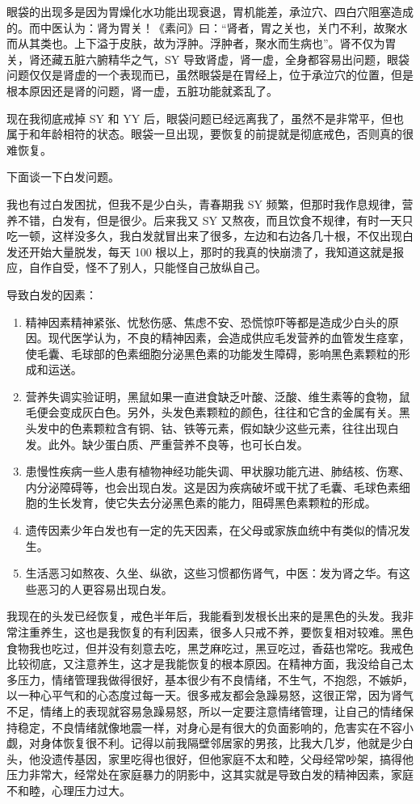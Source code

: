 \documentclass{ctexart}
\begin{document}
眼袋的出现多是因为胃燥化水功能出现衰退，胃机能差，承泣穴、四白穴阻塞造成的。而中医认为：肾为胃关！《素问》曰：“肾者，胃之关也，关门不利，故聚水而从其类也。上下溢于皮肤，故为浮肿。浮肿者，聚水而生病也”。肾不仅为胃关，肾还藏五脏六腑精华之气，SY 导致肾虚，肾一虚，全身都容易出问题，眼袋问题仅仅是肾虚的一个表现而已，虽然眼袋是在胃经上，位于承泣穴的位置，但是根本原因还是肾的问题，肾一虚，五脏功能就紊乱了。

现在我彻底戒掉 SY 和 YY 后，眼袋问题已经远离我了，虽然不是非常平，但也属于和年龄相符的状态。眼袋一旦出现，要恢复的前提就是彻底戒色，否则真的很难恢复。

下面谈一下白发问题。

我也有过白发困扰，但我不是少白头，青春期我 SY 频繁，但那时我作息规律，营养不错，白发有，但是很少。后来我又 SY 又熬夜，而且饮食不规律，有时一天只吃一顿，这样没多久，我白发就冒出来了很多，左边和右边各几十根，不仅出现白发还开始大量脱发，每天 100 根以上，那时的我真的快崩溃了，我知道这就是报应，自作自受，怪不了别人，只能怪自己放纵自己。

导致白发的因素：

\begin{enumerate}
    \item 精神因素精神紧张、忧愁伤感、焦虑不安、恐慌惊吓等都是造成少白头的原因。现代医学认为，不良的精神因素，会造成供应毛发营养的血管发生痉挛，使毛囊、毛球部的色素细胞分泌黑色素的功能发生障碍，影响黑色素颗粒的形成和运送。
    \item 营养失调实验证明，黑鼠如果一直进食缺乏叶酸、泛酸、维生素等的食物，鼠毛便会变成灰白色。另外，头发色素颗粒的颜色，往往和它含的金属有关。黑头发中的色素颗粒含有铜、钴、铁等元素，假如缺少这些元素，往往出现白发。此外。缺少蛋白质、严重营养不良等，也可长白发。
    \item 患慢性疾病一些人患有植物神经功能失调、甲状腺功能亢进、肺结核、伤寒、内分泌障碍等，也会出现白发。这是因为疾病破坏或干扰了毛囊、毛球色素细胞的生长发育，使它失去分泌黑色素的能力，阻碍黑色素颗粒的形成。
    \item 遗传因素少年白发也有一定的先天因素，在父母或家族血统中有类似的情况发生。
    \item 生活恶习如熬夜、久坐、纵欲，这些习惯都伤肾气，中医：发为肾之华。有这些恶习的人更容易出现白发。
\end{enumerate}

我现在的头发已经恢复，戒色半年后，我能看到发根长出来的是黑色的头发。我非常注重养生，这也是我恢复的有利因素，很多人只戒不养，要恢复相对较难。黑色食物我也吃过，但并没有刻意去吃，黑芝麻吃过，黑豆吃过，香菇也常吃。我戒色比较彻底，又注意养生，这才是我能恢复的根本原因。在精神方面，我没给自己太多压力，情绪管理我做得很好，基本很少有不良情绪，不生气，不抱怨，不嫉妒，以一种心平气和的心态度过每一天。很多戒友都会急躁易怒，这很正常，因为肾气不足，情绪上的表现就容易急躁易怒，所以一定要注意情绪管理，让自己的情绪保持稳定，不良情绪就像地震一样，对身心是有很大的负面影响的，危害实在不容小觑，对身体恢复很不利。记得以前我隔壁邻居家的男孩，比我大几岁，他就是少白头，他没遗传基因，家里吃得也很好，但他家庭不太和睦，父母经常吵架，搞得他压力非常大，经常处在家庭暴力的阴影中，这其实就是导致白发的精神因素，家庭不和睦，心理压力过大。
\end{document}
